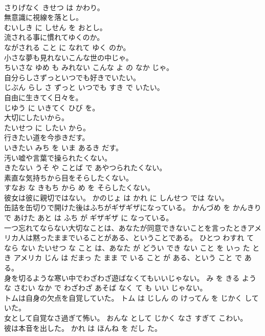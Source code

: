 \documentclass[8pt]{extreport}
\begin{document}
\begin{CJK}{UTF8}{min}
\\	さりげなく きせつ は かわり。	
\\	無意識に視線を落とし。	
\\	むいしき に しせん を おとし。	
\\	流される事に慣れてゆくのか。	
\\	ながされる こと に なれて ゆく のか。	
\\	小さな夢も見れないこんな世の中じゃ。	
\\	ちいさな ゆめ も みれない こんな よ の なか じゃ。	
\\	自分らしさずっといつでも好きでいたい。	
\\	じぶん らし さ ずっと いつでも すき で いたい。	
\\	自由に生きてく日々を。	
\\	じゆう に いきてく ひび を。	
\\	大切にしたいから。	
\\	たいせつ に したい から。	
\\	行きたい道を今歩きだす。	
\\	いきたい みち を いま あるき だす。	
\\	汚い嘘や言葉で操られたくない。	
\\	きたない うそ や ことば で あやつられたくない。	
\\	素直な気持ちから目をそらしたくない。	
\\	すなお な きもち から め を そらしたくない。	
\\	彼女は彼に親切ではない。	かのじょ は かれ に しんせつ では ない。	
\\	缶詰を缶切りで開けた後はふちがギザギザになっている。	かんづめ を かんきり で あけた あと は ふち が ギザギザ に なっている。	
\\	一つ忘れてならない大切なことは、あなたが同意できないことを言ったときアメリカ人は黙ったままでいることがある、ということである。	ひとつ わすれ て なら ない たいせつ な こと は、あなた が どうい でき ない こと を いっ た とき アメリカ じん は だまっ た まま で いる こと が ある、という こと で ある。	
\\	身を切るような寒い中でわざわざ遊ばなくてもいいじゃない。	み を きる よう な さむい なか で わざわざ あそば なく て も いい じゃない。	
\\	トムは自身の欠点を自覚していた。	トム は じしん の けってん を じかく していた。	
\\	女として自覚なさ過ぎて怖い。	おんな として じかく なさ すぎて こわい。	
\\	彼は本音を出した。	かれ は ほんね を だし た。	

\end{CJK}
\end{document}

